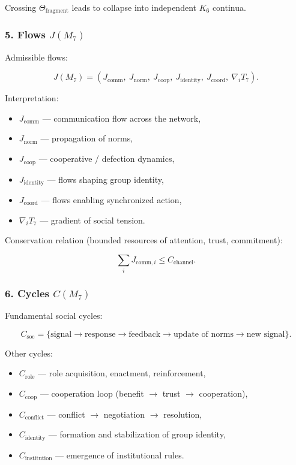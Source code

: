 Crossing $\Theta_{\mathrm{fragment}}$ leads to collapse into independent $K_6$ continua.

\subsubsection*{5. Flows \texorpdfstring{$J(M_7)$}{J(M_7)}}

Admissible flows:

\[
J(M_7)=
\left(
J_{\mathrm{comm}},\
J_{\mathrm{norm}},\
J_{\mathrm{coop}},\
J_{\mathrm{identity}},\
J_{\mathrm{coord}},\
\nabla_i T_7
\right).
\]

Interpretation:

\begin{itemize}
    \item $J_{\mathrm{comm}}$ — communication flow across the network,
    \item $J_{\mathrm{norm}}$ — propagation of norms,
    \item $J_{\mathrm{coop}}$ — cooperative / defection dynamics,
    \item $J_{\mathrm{identity}}$ — flows shaping group identity,
    \item $J_{\mathrm{coord}}$ — flows enabling synchronized action,
    \item $\nabla_i T_7$ — gradient of social tension.
\end{itemize}

Conservation relation (bounded resources of attention, trust, commitment):

\[
\sum_i J_{\mathrm{comm},i} \le C_{\mathrm{channel}}.
\]

\subsubsection*{6. Cycles \texorpdfstring{$C(M_7)$}{C(M_7)}}

Fundamental social cycles:

\[
C_{\mathrm{soc}} =
\{
\text{signal} \to \text{response} \to \text{feedback} \to 
\text{update of norms} \to \text{new signal}
\}.
\]

Other cycles:

\begin{itemize}
    \item $C_{\mathrm{role}}$ — role acquisition, enactment, reinforcement,
    \item $C_{\mathrm{coop}}$ — cooperation loop (benefit $\to$ trust $\to$ cooperation),
    \item $C_{\mathrm{conflict}}$ — conflict $\to$ negotiation $\to$ resolution,
    \item $C_{\mathrm{identity}}$ — formation and stabilization of group identity,
    \item $C_{\mathrm{institution}}$ — emergence of institutional rules.
\end{itemize}

